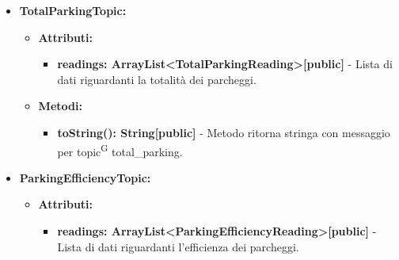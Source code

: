 \documentclass[8pt]{article}
\newcommand{\glossterm}[1]{#1\textsuperscript{G}} %
\begin{document}
\begin{itemize}
\begin{itemize}
	\setlength\itemsep{0em}
        \item \textbf{Attributi:}
        \begin{itemize}
	\setlength\itemsep{0em}
            \item \textbf{readings: ArrayList<PaymentParkingReading>[public]} - Lista di dati riguardanti i pagamenti.
        \end{itemize}
    \end{itemize}
    \begin{itemize}
	\setlength\itemsep{0em}
        \item \textbf{Metodi:}
        \begin{itemize}
	\setlength\itemsep{0em}
            \item \textbf{toString(): String[public]} - Metodo ritorna stringa con messaggio per \glossterm{topic} payment\_parking.
        \end{itemize}
    \end{itemize}
    \item \textbf{TotalParkingTopic:}
    \begin{itemize}
	\setlength\itemsep{0em}
        \item \textbf{Attributi:}
        \begin{itemize}
	\setlength\itemsep{0em}
            \item \textbf{readings: ArrayList<TotalParkingReading>[public]} - Lista di dati riguardanti la totalità dei parcheggi.
        \end{itemize}
    \end{itemize}
    \begin{itemize}
	\setlength\itemsep{0em}
        \item \textbf{Metodi:}
        \begin{itemize}
	\setlength\itemsep{0em}
            \item \textbf{toString(): String[public]} - Metodo ritorna stringa con messaggio per \glossterm{topic} total\_parking.
        \end{itemize}
    \end{itemize}
    \item \textbf{ParkingEfficiencyTopic:}
    \begin{itemize}
	\setlength\itemsep{0em}
        \item \textbf{Attributi:}
        \begin{itemize}
	\setlength\itemsep{0em}
            \item \textbf{readings: ArrayList<ParkingEfficiencyReading>[public]} - Lista di dati riguardanti l'efficienza dei parcheggi.

\end{itemize}
\end{itemize}
\end{itemize}
\end{document}
